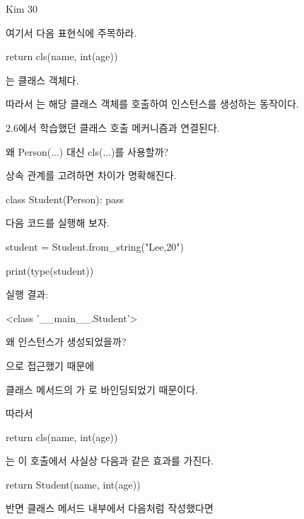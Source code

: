 \begin{dhkzsh}
Kim
30
\end{dhkzsh}

여기서 다음 표현식에 주목하라.

\begin{dhkcode}
return cls(name, int(age))
\end{dhkcode}

는 클래스 객체다.

따라서 는 해당 클래스 객체를 호출하여 인스턴스를 생성하는 동작이다.

2.6에서 학습했던 클래스 호출 메커니즘과 연결된다.

\begin{dhknote}
\begin{dhksmry}[centered]
왜 Person(...) 대신 cls(...)를 사용할까?
\end{dhksmry}
\end{dhknote}

상속 관계를 고려하면 차이가 명확해진다.

\begin{dhkcode}
class Student(Person):
    pass
\end{dhkcode}

다음 코드를 실행해 보자.

\begin{dhkcode}
student = Student.from_string("Lee,20")

print(type(student))
\end{dhkcode}

실행 결과:

\begin{dhkzsh}
<class '__main__.Student'>
\end{dhkzsh}

왜  인스턴스가 생성되었을까?

으로 접근했기 때문에 

클래스 메서드의 가 로 바인딩되었기 때문이다.

따라서

\begin{dhkcode}
return cls(name, int(age))
\end{dhkcode}

는 이 호출에서 사실상 다음과 같은 효과를 가진다.

\begin{dhkcode}
return Student(name, int(age))
\end{dhkcode}

반면 클래스 메서드 내부에서 다음처럼 작성했다면

